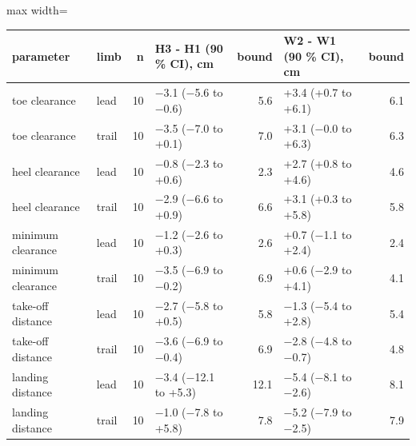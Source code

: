 \begin{adjustbox}{max width=\textwidth}
{\footnotesize
\begin{tabular}{llrlrlr}
\toprule
\textbf{parameter} & \textbf{limb} & \textbf{n} & \textbf{H3 - H1 (90 \% CI), cm} & \textbf{bound} & \textbf{W2 - W1 (90 \% CI), cm} & \textbf{bound} \\
\midrule
toe clearance & lead & 10 & $-$3.1 ($-$5.6 to $-$0.6) & 5.6 & +3.4 (+0.7 to +6.1) & 6.1 \\
toe clearance & trail & 10 & $-$3.5 ($-$7.0 to +0.1) & 7.0 & +3.1 ($-$0.0 to +6.3) & 6.3 \\
heel clearance & lead & 10 & $-$0.8 ($-$2.3 to +0.6) & 2.3 & +2.7 (+0.8 to +4.6) & 4.6 \\
heel clearance & trail & 10 & $-$2.9 ($-$6.6 to +0.9) & 6.6 & +3.1 (+0.3 to +5.8) & 5.8 \\
minimum clearance & lead & 10 & $-$1.2 ($-$2.6 to +0.3) & 2.6 & +0.7 ($-$1.1 to +2.4) & 2.4 \\
minimum clearance & trail & 10 & $-$3.5 ($-$6.9 to $-$0.2) & 6.9 & +0.6 ($-$2.9 to +4.1) & 4.1 \\
take-off distance & lead & 10 & $-$2.7 ($-$5.8 to +0.5) & 5.8 & $-$1.3 ($-$5.4 to +2.8) & 5.4 \\
take-off distance & trail & 10 & $-$3.6 ($-$6.9 to $-$0.4) & 6.9 & $-$2.8 ($-$4.8 to $-$0.7) & 4.8 \\
landing distance & lead & 10 & $-$3.4 ($-$12.1 to +5.3) & 12.1 & $-$5.4 ($-$8.1 to $-$2.6) & 8.1 \\
landing distance & trail & 10 & $-$1.0 ($-$7.8 to +5.8) & 7.8 & $-$5.2 ($-$7.9 to $-$2.5) & 7.9 \\
\bottomrule
\end{tabular}
}
\end{adjustbox}
